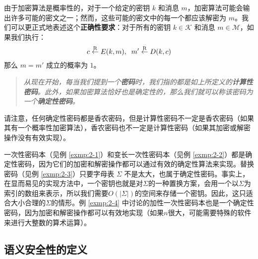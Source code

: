 由于加密算法是概率性的，对于一个给定的密钥 $k$ 和消息 $m$，加密算法可能会输出许多可能的密文之一；然而，这些可能的密文中的每一个都应该解密为 $m$。我们可以更正式地表述这个\textbf{正确性要求}：对于所有的密钥 $k\in\mathcal{K}$ 和消息 $m\in\mathcal{M}$，如果我们执行：
\[
c\overset{\rm R}\leftarrow E(k,m),\;\;
m'\overset{\rm R}\leftarrow D(k,c)
\]
那么 $m=m'$ 成立的概率为 $1$。


\begin{quote}
\begin{tcolorbox}[colframe=black,colback=white,boxrule=0.6pt,arc=0pt]
\emph{从现在开始，每当我们提到一个\textbf{密码}时，我们指的都是如上所定义的\textbf{计算性密码}。此外，如果加密算法恰好也是确定性的，那么我们就可以称该密码为一个\textbf{确定性密码}。}
\end{tcolorbox}
\end{quote}

请注意，任何确定性密码都是香农密码，但是计算性密码不一定是香农密码（如果其有一个概率性加密算法），香农密码也不一定是计算性密码（如果其加密或解密操作没有有效实现）。

\begin{example}
一次性密码本（见例 \ref{exmp:2-1}）和变长一次性密码本（见例 \ref{exmp:2-2}）都是确定性密码，因为它们的加密和解密操作都可以通过有效的确定性算法来实现。替换密码（见例 \ref{exmp:2-3}）只要字母表 $\Sigma$ 不是太大，也属于确定性密码。事实上，在显而易见的实现方法中，一个密钥也就是对$\Sigma$的一种置换方案，会用一个以$\Sigma$为索引的数组来表示，所以我们需要$O(|\Sigma|)$的空间来存储一个密钥。因此，这只适合大小合理的$\Sigma$的情形。例 \ref{exmp:2-4} 中讨论的加性一次性密码本也是一个确定性密码，因为加密和解密操作都可以有效地实现（如果$n$很大，可能需要特殊的软件来进行大整数的算术运算）。
\end{example}

\subsection{语义安全性的定义}

